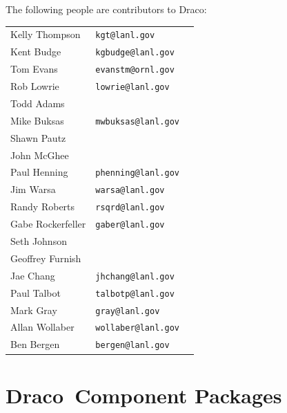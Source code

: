 \documentclass[note]{ResearchNote_pdf}
\newcommand{\draco}{Draco}
\begin{document}
The following people are contributors to \draco:
\begin{center}
  \small
  \begin{tabular}{lll}
    Kelly Thompson    & \texttt{kgt@lanl.gov}       \\
    Kent Budge        & \texttt{kgbudge@lanl.gov}   \\
    Tom Evans         & \texttt{evanstm@ornl.gov}   \\
    Rob Lowrie        & \texttt{lowrie@lanl.gov}    \\
    Todd Adams        & \\
    Mike Buksas       & \texttt{mwbuksas@lanl.gov}  \\
    Shawn Pautz       & \\
    John McGhee       & \\
    Paul Henning      & \texttt{phenning@lanl.gov}  \\
    Jim Warsa         & \texttt{warsa@lanl.gov}     \\
    Randy Roberts     & \texttt{rsqrd@lanl.gov}     \\
    Gabe Rockerfeller & \texttt{gaber@lanl.gov}     \\
    Seth Johnson      & \\
    Geoffrey Furnish  & \\
    Jae Chang         & \texttt{jhchang@lanl.gov}   \\
    Paul Talbot       & \texttt{talbotp@lanl.gov}   \\
    Mark Gray         & \texttt{gray@lanl.gov}      \\
    Allan Wollaber    & \texttt{wollaber@lanl.gov}  \\
    Ben Bergen        & \texttt{bergen@lanl.gov}    \\
  \end{tabular}
\end{center}

\newpage
\section{\draco\ Component Packages}
\end{document}
